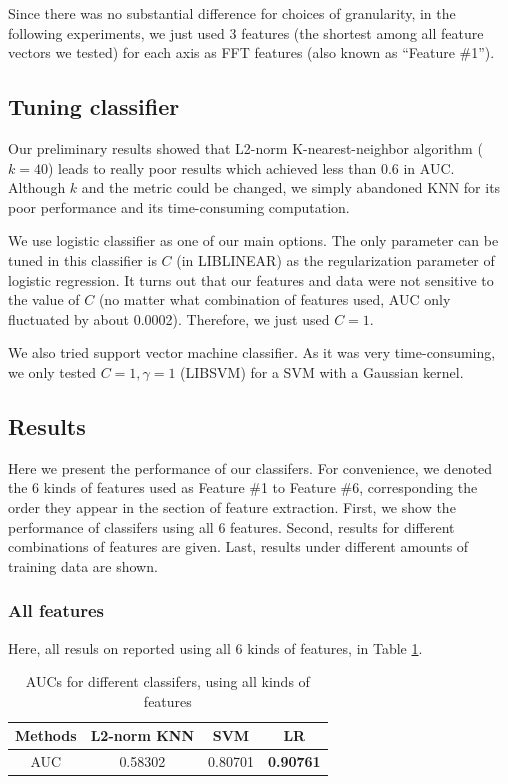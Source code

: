 \documentclass{article} %
\begin{document}
Since there was no substantial difference for choices of granularity, in the following experiments, we just used 3 features (the shortest among all feature vectors we tested) for each axis as FFT features (also known as ``Feature \#1'').

\subsection{Tuning classifier}
Our preliminary results showed that L2-norm K-nearest-neighbor algorithm ($k=40$) leads to really poor results which achieved less than 0.6 in AUC. Although $k$ and the metric could be changed, we simply abandoned KNN for its poor performance and its time-consuming computation.

We use logistic classifier as one of our main options. The only parameter can be tuned in this classifier is $C$ (in LIBLINEAR) as the regularization parameter of logistic regression. It turns out that our features and data were not sensitive to the value of $C$ (no matter what combination of features used, AUC only fluctuated by about 0.0002). Therefore, we just used $C=1$.

We also tried support vector machine classifier. As it was very time-consuming, we only tested $C=1, \gamma=1$ (LIBSVM) for a SVM with a Gaussian kernel.

\subsection{Results}

Here we present the performance of our classifers. For convenience, we denoted the 6 kinds of features used as Feature \#1 to Feature \#6, corresponding the order they appear in the section of feature extraction. First, we show the performance of classifers using all 6 features. Second, results for different combinations of features are given. Last, results under different amounts of training data are shown.

\subsubsection{All features} %
\label{ssub:all_features}
Here, all resuls on reported using all 6 kinds of features, in Table \ref{tbl:test_result}.

\begin{table}[!ht]
\caption{AUCs for different classifers, using all kinds of features}
\label{tbl:test_result}
	\begin{center}
		\begin{tabular}{ c | c  c  c  }
			\hline
			 Methods & L2-norm KNN & SVM & LR \\
			 \hline
			 AUC & 0.58302 & 0.80701 & \textbf{0.90761} \\
			 \hline
		\end{tabular}
	\end{center}
\end{table}
\end{document}
